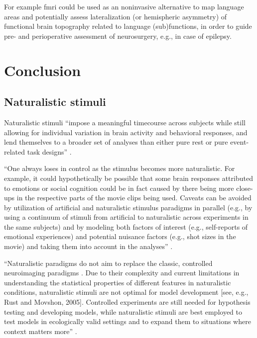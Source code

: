 
%
For example \ac{fmri} could be used as an noninvasive alternative to map
language areas and potentially assess lateralization (or hemispheric asymmetry)
of functional brain topography related to language (sub)functions, in order to
guide pre- and perioperative assessment of neurosurgery, e.g., in case of
epilepsy.


\section{Conclusion}

\subsection{Naturalistic stimuli}


%
Naturalistic stimuli ``impose a meaningful timecourse across subjects while
still allowing for individual variation in brain activity and behavioral
responses, and lend themselves to a broader set of analyses than either pure
rest or pure event-related task designs'' \citep[][p. 142]{finn2017can}.

%
``One always loses in control as the stimulus becomes more naturalistic.
%
For example, it could hypothetically be possible that some brain responses
attributed to emotions or social cognition could be in fact caused by there
being more close-ups in the respective parts of the movie clips being used.
%
Caveats can be avoided by utilization of artificial and naturalistic stimulus
paradigms in parallel (e.g., by using a continuum of stimuli from artificial to
naturalistic across experiments in the same subjects) and by modeling both
factors of interest (e.g., self-reports of emotional experiences) and potential
nuisance factors (e.g., shot sizes in the movie) and taking them into account in
the analyses'' \citep{jaaskelainen2021movies}.

%
``Naturalistic paradigms do not aim to replace the classic, controlled
neuroimaging paradigms \citep{sonkusare2019naturalistic}.
%
Due to their complexity and current limitations in understanding the statistical
properties of different features in naturalistic conditions, naturalistic
stimuli are not optimal for model development [see, e.g., Rust and Movshon,
2005].
%
Controlled experiments are still needed for hypothesis testing and developing
models, while naturalistic stimuli are best employed to test models in
ecologically valid settings and to expand them to situations where context
matters more'' \citep[][p. 19]{saarimaki2021naturalistic}.

